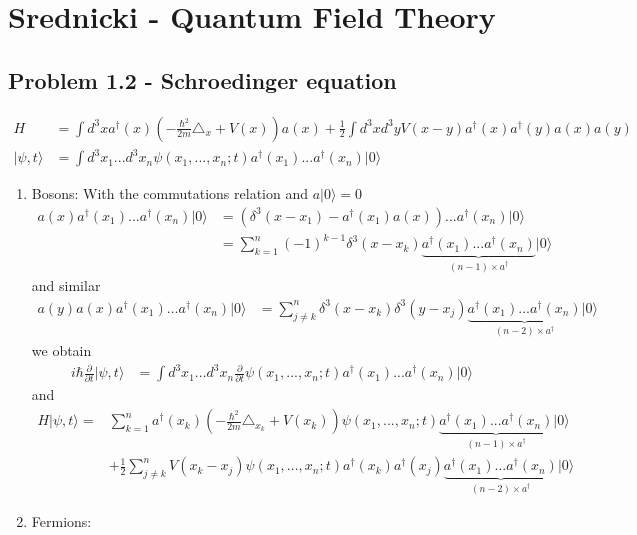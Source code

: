 \documentclass[../main.tex]{subfiles}
\begin{document}
\section{{\sc Srednicki} - Quantum Field Theory}
\subsection{Problem 1.2 - Schroedinger equation}
\begin{align}
    H&=\int d^3x a^\dagger(x)\left(-\frac{\hbar^2}{2m}\triangle_x+V(x)\right)a(x)+\frac{1}{2}\int d^3xd^3yV(x-y)a^\dagger(x)a^\dagger(y)a(x)a(y)\\
    |\psi,t\rangle&=\int d^3x_1...d^3x_n\psi(x_1,...,x_n;t)a^\dagger(x_1)...a^\dagger(x_n)|0\rangle
\end{align}
\begin{enumerate}
    \item Bosons:
    With the commutations relation and $a|0\rangle=0$
    \begin{align}
        a(x)a^\dagger(x_1)...a^\dagger(x_n)|0\rangle
        &=\left(\delta^3(x-x_1)-a^\dagger(x_1)a(x)\right)...a^\dagger(x_n)|0\rangle\\
        &=\sum_{k=1}^n(-1)^{k-1} \delta^3(x-x_k)\underbrace{a^\dagger(x_1)...a^\dagger(x_n)}_{(n-1) \times a^\dagger}|0\rangle
    \end{align}
    and similar
    \begin{align}
        a(y)a(x)a^\dagger(x_1)...a^\dagger(x_n)|0\rangle
        &=\sum_{j\neq k}^n \delta^3(x-x_k)\delta^3(y-x_j)\underbrace{a^\dagger(x_1)...a^\dagger(x_n)}_{(n-2) \times a^\dagger}|0\rangle
    \end{align}
    we obtain
	\begin{align}
		i\hbar\frac{\partial}{\partial t}|\psi,t\rangle
		&=\int d^3x_1...d^3x_n\frac{\partial}{\partial t}\psi(x_1,...,x_n;t)a^\dagger(x_1)...a^\dagger(x_n)|0\rangle 
	\end{align}
    and
    \begin{align}
        H|\psi,t\rangle=&\sum_{k=1}^na^\dagger(x_k)\left(-\frac{\hbar^2}{2m}\triangle_{x_k}+V(x_k)\right)\psi(x_1,...,x_n;t)\underbrace{a^\dagger(x_1)...a^\dagger(x_n)}_{(n-1) \times a^\dagger}|0\rangle\\
        &+\frac{1}{2}\sum_{j\neq k}^nV(x_k-x_j)\psi(x_1,...,x_n;t)a^\dagger(x_k)a^\dagger(x_j)\underbrace{a^\dagger(x_1)...a^\dagger(x_n)}_{(n-2) \times a^\dagger}|0\rangle
    \end{align}
    \item Fermions:
\end{enumerate}
\end{document}
